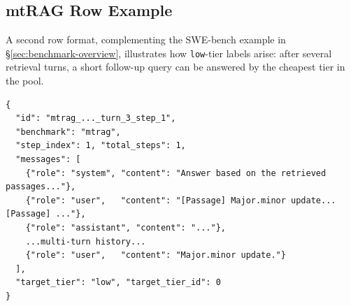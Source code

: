 \subsection{mtRAG Row Example}
\label{app:mtrag-example}

A second row format, complementing the SWE-bench example in \S\ref{sec:benchmark-overview}, illustrates how \texttt{low}-tier labels arise: after several retrieval turns, a short follow-up query can be answered by the cheapest tier in the pool.

\begin{center}
\begin{minipage}{0.95\linewidth}
\scriptsize
\begin{verbatim}
{
  "id": "mtrag_..._turn_3_step_1",
  "benchmark": "mtrag",
  "step_index": 1, "total_steps": 1,
  "messages": [
    {"role": "system", "content": "Answer based on the retrieved passages..."},
    {"role": "user",   "content": "[Passage] Major.minor update... [Passage] ..."},
    {"role": "assistant", "content": "..."},
    ...multi-turn history...
    {"role": "user",   "content": "Major.minor update."}
  ],
  "target_tier": "low", "target_tier_id": 0
}
\end{verbatim}
\end{minipage}
\end{center}
